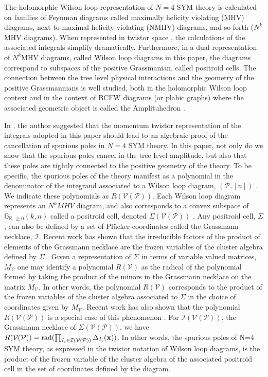 \documentclass[11pt]{article}
\newcommand{\R}{\mathbb{R}}
\newcommand{\Gr}{\mathbb{G}_{\R, \geq 0}}
\newcommand{\cP}{\mathcal{P}}
\newcommand{\cV}{\mathcal{V}}
\newcommand{\VP}{\cV(\cP)}
\newcommand{\cI}{\mathcal{I}}
\theoremstyle{remark}
\theoremstyle{definition}
\begin{document}
The holomorphic Wilson loop representation of $N=4$ SYM theory is calculated on families of Feynman diagrams called maximally helicity violating (MHV) diagrams, next to maximal helicity violating (NMHV) diagrams, and so forth ($N^k$MHV diagrams). When represented in twistor space \cite{Adamo:2011pr,Boels:2007qn, Bullimore:2010pj}, the calculations of the associated integrals simplify dramatically. Furthermore, in a dual representation of $N^k$MHV diagrams, called Wilson loop diagrams in this paper, the diagrams correspond to subspaces of the positive Grassmanian, called positroid cells. The connection between the tree level physical interactions and the geometry of the positive Grassmannians is well studied, both in the holomorphic Wilson loop context and in the context of BCFW diagrams (or plabic graphs) where the associated geometric object is called the Amplituhedron \cite[Chapter 2]{GrassmannAmplitudebook}. 

In \cite{hodges:2013eliminating}, the author suggested that the momentum twistor representation of the integrals adopted in this paper should lead to an algebraic proof of the cancellation of spurious poles in  $N=4$ SYM theory. In this paper, not only do we show that the spurious poles cancel in the tree level amplitude,  but also that these poles are tightly connected to the positive geometry of the theory. To be specific, the spurious poles of the theory manifest as a polynomial in the denominator of the integrand associated to a Wilson loop diagram, $(\cP, [n])$ \cite{Adamo:2012xe, HeslopStewart, hodges:2013eliminating}. We indicate these polynomials as $R(\VP)$. Each Wilson loop diagram represents an $N^kMHV$ diagram, and also corresponds to a convex subspace of $\Gr(k,n)$ called a positroid cell, denoted $\Sigma(\VP)$ \cite{Wilsonloop, generalcombinatoricsI}. Any positroid cell, $\Sigma$, can also be defined by a set of Pl\"{u}cker coordinates called the Grassmann necklace, $\cI$\cite[Section 16]{Postnikov}. Recent work has shown that the irreducible factors of the product of elements of the Grassmann necklace are the frozen variables of the cluster algebra defined by $\Sigma$ \cite{galashinlam19, SS-BW}. Given a representation of $\Sigma$ in terms of variable valued matrices, $M_\cV$ one may identify a polynomial $R(\cV)$ as the radical of the polynomial formed by taking the product of the minors in the Grassmann necklace on the matrix $M_\cV$. In other words, the polynomial $R(\cV)$ corresponds to the product of the frozen variables of the cluster algebra associated to $\Sigma$ in the choice of coordinates given by $M_\cV$. Recent work has also shown that the polynomial $R(\VP)$ is a special case of this phenomenon \cite{generalcombinatoricsI}. For $\cI(\VP)$, the Grassmann necklace of $\Sigma(\VP)$, we have $R(\VP) = \textrm{rad}(\prod_{I_i \in \cI(\VP)} \Delta_{I_i}(\bf{x}))$. In other words, the spurious poles of N=4 SYM theory, as expressed in the twistor notation of Wilson loop diagrams, is the product of the frozen variable of the cluster algebra of the associated positroid cell in the set of coordinates defined by the diagram.
\end{document}
